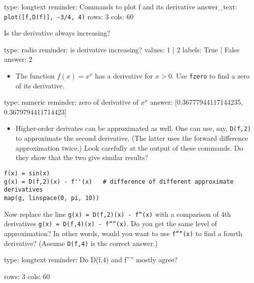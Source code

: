\documentclass[12pt]{article}
\begin{document}
\begin{answer}
type: longtext
reminder: Commands to plot f and its derivative
answer_text: \verb+plot([f,D(f)], -3/4, 4)+ 
rows: 3
cols: 60
\end{answer}

Is the derivative always increasing?

\begin{answer}
type: radio
reminder: is derivative increasing?
values: 1 | 2
labels: True | False
answer: 2
\end{answer}

\begin{itemize}
\itemsep1pt\parskip0pt
\item
  The function $f(x) = x^x$ has a derivative for $x > 0$. Use
  \texttt{fzero} to find a zero of its derivative.
\end{itemize}

\begin{answer}
    type: numeric
    reminder: zero of derivative of \( x^x \)
    answer: [0.36777944117144235, 0.3679794411714423]

\end{answer}

\begin{itemize}
\itemsep1pt\parskip0pt
\item
  Higher-order derivates can be approximated as well. One can use, say,
  \texttt{D(f,2)} to approximate the second derivative. (The latter uses
  the forward difference approximation twice.) Look carefully at the
  output of these commands. Do they show that the two give similar
  results?
\end{itemize}



\begin{verbatim}
f(x) = sin(x)
g(x) = D(f,2)(x) - f''(x)   # difference of different approximate derivatives
map(g, linspace(0, pi, 10))
\end{verbatim}
Now replace the line \texttt{g(x) = D(f,2)(x) - f''(x)} with a
comparison of 4th derivatives \texttt{g(x) = D(f,4)(x) - f''''(x)}. Do
you get the same level of approximation? In other words, would you want
to use \texttt{f''''(x)} to find a fourth derivative? (Assume
\texttt{D(f,4)} is the correct answer.)

\begin{answer}
type: longtext
reminder: Do D(f,4) and f'''' mostly agree?

rows: 3
cols: 60
\end{answer}
\end{document}
